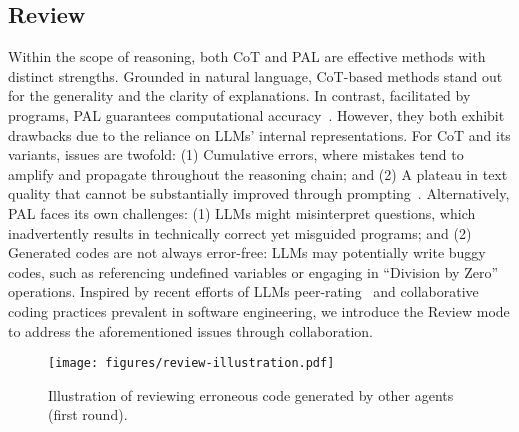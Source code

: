 \subsection{Review}
Within the scope of reasoning, 
both CoT and PAL are effective methods with distinct strengths.
Grounded in natural language, 
CoT-based methods stand out for the generality and the clarity of explanations.
In contrast,
facilitated by programs, 
PAL guarantees computational accuracy~\citep{zhao2023automatic}. 
However, 
they both exhibit drawbacks due to the reliance on LLMs' internal representations. 
For CoT and its variants,
issues are twofold: 
(1) Cumulative errors, where mistakes tend to amplify and propagate throughout the reasoning chain;
and (2) A plateau in text quality that cannot be substantially improved through prompting~\citep{xu2022learning, li2023contrastive}.
Alternatively, 
PAL faces its own challenges:
(1) LLMs might misinterpret questions,
which inadvertently results in technically correct yet misguided programs;
and (2) Generated codes are not always error-free:
LLMs may potentially write buggy codes,
such as referencing undefined variables or engaging in ``Division by Zero'' operations.
Inspired by recent efforts of LLMs peer-rating~\citep{zheng2023judging} and collaborative coding practices prevalent in software engineering, 
we introduce the Review mode to address the aforementioned issues through collaboration.
\begin{wrapfigure}{r}{4.5cm}
\vspace{-0.5em}
    \centering
    \texttt{[image: figures/review-illustration.pdf]}
    \caption{Illustration of reviewing erroneous code generated by other agents (first round).}
    \vspace{-2.75em}
    \label{fig:review-illustration}
\end{wrapfigure}

